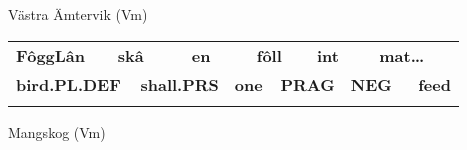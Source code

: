 
\begin{listWWNumileveli}
\item {}

\end{listWWNumileveli}

\begin{listWWNumxviiileveli}
\item {}

\begin{styleExLtrTbl}
Västra Ämtervik (Vm) 

\end{styleExLtrTbl}

\end{listWWNumxviiileveli}

\begin{tabular}{llllllllllll}
\lsptoprule
{\bfseries FôggLân} & \multicolumn{2}{l}{{\bfseries skâ}

} & \multicolumn{2}{l}{{\bfseries en}

} & \multicolumn{2}{l}{{\bfseries fôll}

} & \multicolumn{2}{l}{{\bfseries int}

} & \multicolumn{2}{l}{{\bfseries mat…}

} & \\
\multicolumn{2}{l}{{\bfseries bird.PL.DEF}

} & \multicolumn{2}{l}{{\bfseries shall.PRS}

} & \multicolumn{2}{l}{{\bfseries one}

} & \multicolumn{2}{l}{{\bfseries PRAG}

} & \multicolumn{2}{l}{{\bfseries NEG}

} & \multicolumn{2}{l}{{\bfseries feed}

}\\
\lspbottomrule
\end{tabular}

\begin{styleExLtrTblii}
Mangskog (Vm) 

\end{styleExLtrTblii}

